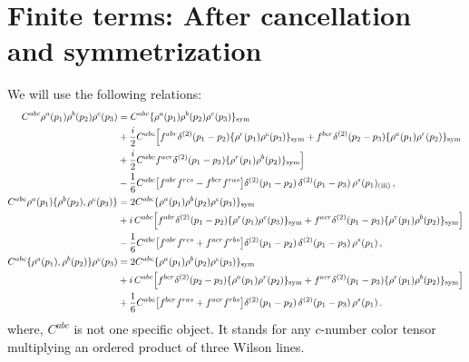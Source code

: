 \documentclass[9pt]{article}
\numberwithin{equation}{section}
\begin{document}
\section{Finite terms: After cancellation and symmetrization}\label{sec:D}
We will use the following relations: 
\begin{align}
C^{abc}\rho^{a}(p_{1})\rho^{b}(p_{2})\rho^{c}(p_{3})&=C^{abc}\{\rho^{a}(p_{1})\rho^{b}(p_{2})\rho^{c}(p_{3})\}_{\rm sym}\notag\\
&+\frac{i}{2}C^{abc}\Big[f^{abr}\delta^{(2)}(p_{1}-p_{2})\{\rho^{r}(p_{1})\rho^{c}(p_{3})\}_{\rm sym}+f^{bcr}\delta^{(2)}(p_{2}-p_{3})\{\rho^{a}(p_{1})\rho^{r}(p_{2})\}_{\rm sym}\notag\\
&+\frac{i}{2}C^{abc}f^{acr}\delta^{(2)}(p_{1}-p_{3})\{\rho^{r}(p_{1})\rho^{b}(p_{2})\}_{\rm sym}\Big]\notag\\
&-\frac{1}{6}C^{abc}\big[f^{abr}f^{rcs}-f^{bcr}f^{ras}\big]\delta^{(2)}(p_{1}-p_{2})\,\delta^{(2)}(p_{1}-p_{3})\,\rho^{s}(p_{1})_{\rm (iii)}\,,\label{eq:D-ord}\\
C^{abc}\rho^{a}(p_{1})\{\rho^{b}(p_{2}),\rho^{c}(p_{3})\}&=2C^{abc}\{\rho^{a}(p_{1})\rho^{b}(p_{2})\rho^{c}(p_{3})\}_{\rm sym}\notag\\
&+i\,C^{abc}\Big[f^{abr}\delta^{(2)}(p_{1}-p_{2})\{\rho^{r}(p_{1})\rho^{c}(p_{3})\}_{\rm sym}+f^{acr}\delta^{(2)}(p_{1}-p_{3})\{\rho^{r}(p_{1})\rho^{b}(p_{2})\}_{\rm sym}\Big]\notag\\
&-\frac{1}{6}C^{abc}\big[f^{abr}f^{rcs}+f^{acr}f^{rbs}\big]\delta^{(2)}(p_{1}-p_{2})\,\delta^{(2)}(p_{1}-p_{3})\,\rho^{s}(p_{1})\,,\label{eq:D-r12}\\
C^{abc}\{\rho^{a}(p_{1}),\rho^{b}(p_{2})\}\rho^{c}(p_{3})&=2C^{abc}\{\rho^{a}(p_{1})\rho^{b}(p_{2})\rho^{c}(p_{3})\}_{\rm sym}\notag\\
&+i\,C^{abc}\Big[f^{bcr}\delta^{(2)}(p_{2}-p_{3})\{\rho^{a}(p_{1})\rho^{r}(p_{2})\}_{\rm sym}+f^{acr}\delta^{(2)}(p_{1}-p_{3})\{\rho^{r}(p_{1})\rho^{b}(p_{2})\}_{\rm sym}\Big]\notag\\
&+\frac{1}{6}C^{abc}\big[f^{bcr}f^{ras}+f^{acr}f^{rbs}\big]\delta^{(2)}(p_{1}-p_{2})\,\delta^{(2)}(p_{1}-p_{3})\,\rho^{s}(p_{1})\,.\label{eq:D-r21}
\end{align}
where, $C^{abc}$ is not one specific object. It stands for any $c$-number color tensor multiplying an ordered product of three Wilson lines. 
\end{document}
